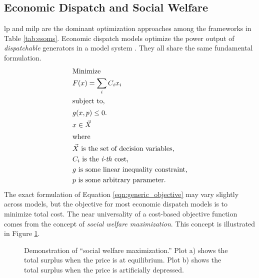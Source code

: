 \subsection{Economic Dispatch and Social Welfare}
\Ac{lp} and \ac{milp} are the dominant optimization approaches among the
frameworks in Table \ref{tab:esoms}. Economic dispatch models optimize the power
output of \textit{dispatchable} generators in a model system
\cite{de_queiroz_repurposing_2019, neumann_near-optimal_2021}. They all share
the same fundamental formulation.
\begin{align}
    \intertext{Minimize}
    \label{eqn:generic_objective}
    &F(x) = \sum_i C_i x_i\\
    \intertext{subject to,}
    &g(x, p) \leq 0.\nonumber\\
    &x \in \vec{X}\nonumber\\
    \intertext{where}
    &\vec{X} \text{ is the set of decision variables,}\nonumber\\
    & C_i \text{ is the \textit{i-th} cost,}\nonumber\\
    & g \text{ is some linear inequality constraint,}\nonumber\\
    & p \text{ is some arbitrary parameter.}\nonumber
\end{align}
The exact formulation of Equation \ref{eqn:generic_objective} may vary slightly
across models, but the objective for most economic dispatch models is to
minimize total cost. The near universality of a cost-based objective function
comes from the concept of \textit{social welfare maximization}. This concept is
illustrated in Figure \ref{fig:social-max}.

\begin{figure}[H]
  \centering
  \resizebox{\columnwidth}{!}{}
  \caption{Demonstration of ``social welfare maximization.'' Plot a) shows the
  total surplus when the price is at equilibrium. Plot b) shows the total
  surplus when the price is artificially depressed.}
  \label{fig:social-max}
\end{figure}

